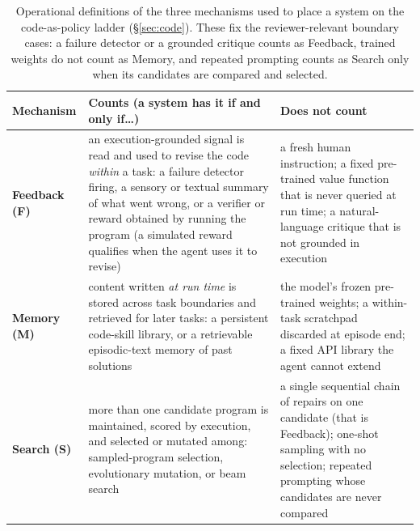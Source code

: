 \begin{table}[t]
\centering
\footnotesize
\renewcommand{\arraystretch}{1.3}
\begin{tabular}{@{}l p{} p{}@{}}
\toprule
\textbf{Mechanism} & \textbf{Counts (a system has it if and only if\ldots)} & \textbf{Does not count} \\
\midrule
\textbf{Feedback (F)} &
an execution-grounded signal is read and used to revise the code \emph{within} a task: a
failure detector firing, a sensory or textual summary of what went wrong, or a verifier or
reward obtained by running the program (a simulated reward qualifies when the agent uses it to
revise) &
a fresh human instruction; a fixed pre-trained value function that is never queried at run
time; a natural-language critique that is not grounded in execution \\
\textbf{Memory (M)} &
content written \emph{at run time} is stored across task boundaries and retrieved for later
tasks: a persistent code-skill library, or a retrievable episodic-text memory of past
solutions &
the model's frozen pre-trained weights; a within-task scratchpad discarded at episode end; a
fixed API library the agent cannot extend \\
\textbf{Search (S)} &
more than one candidate program is maintained, scored by execution, and selected or mutated
among: sampled-program selection, evolutionary mutation, or beam search &
a single sequential chain of repairs on one candidate (that is Feedback); one-shot sampling
with no selection; repeated prompting whose candidates are never compared \\
\bottomrule
\end{tabular}
\caption{Operational definitions of the three mechanisms used to place a system on the
code-as-policy ladder (\S\ref{sec:code}). These fix the reviewer-relevant boundary cases: a
failure detector or a grounded critique counts as Feedback, trained weights do not count as
Memory, and repeated prompting counts as Search only when its candidates are compared and
selected.}
\label{tab:defs}
\end{table}
